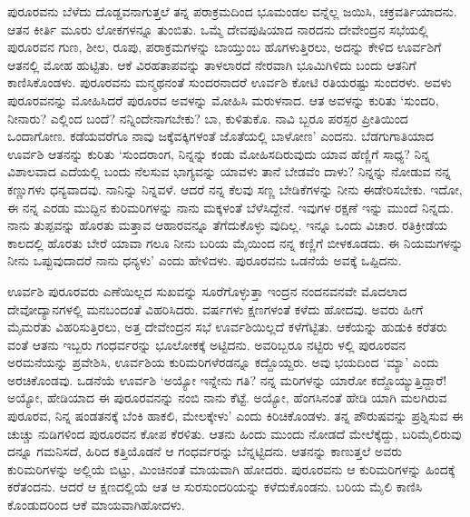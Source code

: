 ಪುರೂರವನು ಬೆಳೆದು ದೊಡ್ಡವನಾಗುತ್ತಲೆ ತನ್ನ ಪರಾಕ್ರಮದಿಂದ ಭೂಮಂಡಲ ವನ್ನೆಲ್ಲ ಜಯಿಸಿ, ಚಕ್ರವರ್ತಿಯಾದನು. ಆತನ ಕೀರ್ತಿ ಮೂರು ಲೋಕಗಳನ್ನೂ ತುಂಬಿತು. ಒಮ್ಮೆ ದೇವಪುಷಿಯಾದ ನಾರದನು ದೇವೇಂದ್ರನ ಸಭೆಯಲ್ಲಿ ಪುರೂರವನ ಗುಣ, ಶೀಲ, ರೂಪು, ಪರಾಕ್ರಮಗಳನ್ನು ಬಾಯ್ತುಂಬ ಹೊಗಳುತ್ತಿರಲು, ಅದನ್ನು ಕೇಳಿದ ಊರ್ವಶಿಗೆ ಆತನಲ್ಲಿ ಮೋಹ ಹುಟ್ಟಿತು. ಆಕೆ ವಿರಹತಾಪವನ್ನು ತಾಳಲಾರದೆ ನೇರವಾಗಿ ಭೂಮಿಗಿಳಿದು ಬಂದು ಆತನಿಗೆ ಕಾಣಿಸಿಕೊಂಡಳು. ಪುರೂರವನು ಮನ್ಮಥನಂತೆ ಸುಂದರನಾದರೆ ಊರ್ವಶಿ ಕೋಟಿ ರತಿಯರಷ್ಟು ಸುಂದರಳು. ಅವಳು ಪುರೂರವನನ್ನು ಮೋಹಿಸಿದರೆ ಪುರೂರವ ಅವಳನ್ನು ಮೋಹಿಸಿ ಮರುಳನಾದ. ಆತ ಅವಳನ್ನು ಕುರಿತು ‘ಸುಂದರಿ, ನೀನಾರು? ಎಲ್ಲಿಂದ ಬಂದೆ? ನನ್ನಿಂದೇನಾಗಬೇಕು? ಬಾ, ಕುಳಿತುಕೊ. ನಾವಿ ಬ್ಬರೂ ಪರಸ್ಪರ ಪ್ರೀತಿಯಿಂದ ಒಂದಾಗೋಣ. ಕಡೆಯವರೆಗೂ ನಾವು ಜಕ್ಕೆವಕ್ಕಿಗಳಂತೆ ಜೊತೆಯಲ್ಲಿ ಬಾಳೋಣ’ ಎಂದನು. ಬೆಡಗುಗಾತಿಯಾದ ಊರ್ವಶಿ ಆತನನ್ನು ಕುರಿತು ‘ಸುಂದರಾಂಗ, ನಿನ್ನನ್ನು ಕಂಡು ಮೋಹಿಸದಿರುವುದು ಯಾವ ಹೆಣ್ಣಿಗೆ ಸಾಧ್ಯ? ನಿನ್ನ ವಿಶಾಲವಾದ ಎದೆಯಲ್ಲಿ ಬಂದು ನೆಲಸುವ ಭಾಗ್ಯವನ್ನು ಯಾವಳು ತಾನೆ ಬೇಡವೆಂ ದಾಳು? ನಿನ್ನನ್ನು ನೋಡುವ ನನ್ನ ಕಣ್ಣುಗಳು ಧನ್ಯವಾದವು. ನಾನಿನ್ನು ನಿನ್ನವಳೆ. ಆದರೆ ನನ್ನ ಕೆಲವು ಸಣ್ಣ ಬೇಡಿಕೆಗಳನ್ನು ನೀನು ಈಡೇರಿಸಬೇಕು. ಇದೋ, ಈ ನನ್ನ ಎರಡು ಮುದ್ದಿನ ಕುರಿಮರಿಗಳನ್ನು ನಾನು ಮಕ್ಕಳಂತೆ ಬೆಳೆಸಿದ್ದೇನೆ. ಇವುಗಳ ರಕ್ಷಣೆ ಇನ್ನು ಮುಂದೆ ನಿನ್ನದು. ನಾನು ತುಪ್ಪವನ್ನು ಹೊರತು ಮತ್ತಾವ ಆಹಾರವನ್ನೂ ತೆಗೆದುಕೊಳ್ಳು ವುದಿಲ್ಲ. ಇನ್ನೂ ಒಂದು ವಿಚಾರ. ರತಿಕ್ರೀಡೆಯ ಕಾಲದಲ್ಲಿ ಹೊರತು ಬೇರೆ ಯಾವಾ ಗಲೂ ನೀನು ಬರಿಯ ಮೈಯಿಂದ ನನ್ನ ಕಣ್ಣಿಗೆ ಬೀಳಕೂಡದು. ಈ ನಿಯಮಗಳನ್ನು ನೀನು ಒಪ್ಪುವುದಾದರೆ ನಾನು ಧನ್ಯಳು’ ಎಂದು ಹೇಳಿದಳು. ಪುರೂರವನು ಒಡನೆಯೆ ಅವಕ್ಕೆ ಒಪ್ಪಿದನು.

ಊರ್ವಶಿ ಪುರೂರವರು ಎಣೆಯಿಲ್ಲದ ಸುಖವನ್ನು ಸೂರೆಗೊಳ್ಳುತ್ತಾ ಇಂದ್ರನ ನಂದನವನವೇ ಮೊದಲಾದ ದೇವೋದ್ಯಾನಗಳಲ್ಲಿ ಮನಬಂದಂತೆ ವಿಹರಿಸಿದರು. ವರ್ಷಗಳು ಕ್ಷಣಗಳಂತೆ ಕಳೆದು ಹೋದವು. ಅವರು ಹೀಗೆ ಮೈಮರೆತು ವಿಹರಿಸುತ್ತಿರಲು, ಅತ್ತ ದೇವೇಂದ್ರನ ಸಭೆ ಊರ್ವಶಿಯಿಲ್ಲದೆ ಕಳೆಗೆಟ್ಟಿತು. ಆಕೆಯನ್ನು ಹುಡುಕಿ ಕರೆತರು ವಂತೆ ಆತನು ಇಬ್ಬರು ಗಂಧರ್ವರನ್ನು ಭೂಲೋಕಕ್ಕೆ ಅಟ್ಟಿದನು. ಅವರಿಬ್ಬರೂ ನಟ್ಟಿರು ಳಲ್ಲಿ ಪುರೂರವನ ಅರಮನೆಯನ್ನು ಪ್ರವೇಶಿಸಿ, ಊರ್ವಶಿಯ ಕುರಿಮರಿಗಳೆರಡನ್ನೂ ಕದ್ದೊಯ್ದರು. ಅವು ಭಯದಿಂದ ‘ಮ್ಯಾ’ ಎಂದು ಅರಚಿಕೊಂಡವು. ಒಡನೆಯೆ ಊರ್ವಶಿ ‘ಅಯ್ಯೋ ಇನ್ನೇನು ಗತಿ? ನನ್ನ ಮರಿಗಳನ್ನು ಯಾರೋ ಕದ್ದೊಯ್ಯುತ್ತಿದ್ದಾರೆ! ಅಯ್ಯೋ, ಹೇಡಿಯಾದ ಈ ಪುರೂರವನನ್ನು ನಂಬಿ ನಾನು ಕೆಟ್ಟೆ. ಅಯ್ಯೋ, ಹೆಂಗಸಿನಂತೆ ಹೇಡಿ ಯಾಗಿ ಮಲಗಿರುವ ಪುರೂರವ, ನಿನ್ನ ಷಂಡತನಕ್ಕೆ ಬೆಂಕಿ ಹಾಕಲಿ, ಮೇಲಕ್ಕೇಳು’ ಎಂದು ಕಿರಿಚಿಕೊಂಡಳು. ತನ್ನ ಪೌರುಷವನ್ನು ಪ್ರಶ್ನಿಸುವ ಈ ಚುಚ್ಚು ನುಡಿಗಳಿಂದ ಪುರೂರವನ ಕೋಪ ಕೆರಳಿತು. ಆತನು ಹಿಂದು ಮುಂದು ನೋಡದೆ ಮೇಲೆಕ್ಕೆದ್ದು, ಬರಿಮೈಲಿರುವು ದನ್ನೂ ಗಮನಿಸದೆ, ಹಿರಿದ ಕತ್ತಿಯೊಡನೆ ಆ ಗಂಧರ್ವರನ್ನು ಬೆನ್ನಟ್ಟಿದನು. ಆತನನ್ನು ಕಾಣುತ್ತಲೆ ಅವರು ಕುರಿಮರಿಗಳನ್ನು ಅಲ್ಲಿಯೆ ಬಿಟ್ಟು, ಮಿಂಚಿನಂತೆ ಮಾಯವಾಗಿ ಹೋದರು. ಪುರೂರವನು ಆ ಕುರಿಮರಿಗಳನ್ನು ಹಿಂದಕ್ಕೆ ಕರೆತಂದನು. ಆದರೆ ಆ ಕ್ಷಣದಲ್ಲಿಯೆ ಆತ ಆ ಸುರಸುಂದರಿಯನ್ನು ಕಳೆದುಕೊಂಡನು. ಬರಿಯ ಮೈಲಿ ಕಾಣಿಸಿ ಕೊಂಡುದರಿಂದ ಆಕೆ ಮಾಯವಾಗಿಹೋದಳು.

